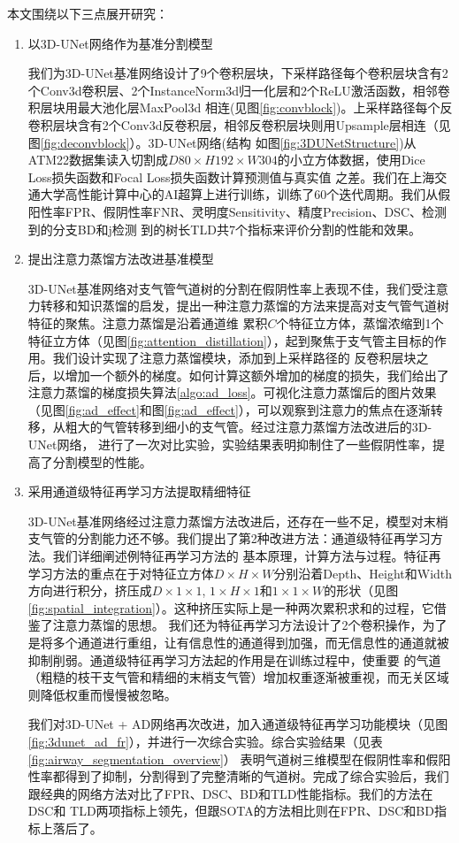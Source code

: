 本文围绕以下三点展开研究：
\begin{enumerate}
    \item {\heiti 以3D-UNet网络作为基准分割模型}

    我们为3D-UNet基准网络设计了9个卷积层块，下采样路径每个卷积层块含有2个Conv3d卷积层、2个InstanceNorm3d归一化层和2个ReLU激活函数，相邻卷积层块用最大池化层MaxPool3d
    相连(见图\ref{fig:convblock})。上采样路径每个反卷积层块含有2个Conv3d反卷积层，相邻反卷积层块则用Upsample层相连（见图\ref{fig:deconvblock}）。3D-UNet网络(结构
    如图\ref{fig:3DUNetStructure})从ATM22数据集读入切割成$D80 \times H192 \times W304$的小立方体数据，使用Dice Loss损失函数和Focal Loss损失函数计算预测值与真实值
    之差。我们在上海交通大学高性能计算中心的AI超算上进行训练，训练了60个迭代周期。我们从假阳性率FPR、假阴性率FNR、灵明度Sensitivity、精度Precision、DSC、检测到的分支BD和j检测
    到的树长TLD共7个指标来评价分割的性能和效果。

    \item {\heiti 提出注意力蒸馏方法改进基准模型}

    3D-UNet基准网络对支气管气道树的分割在假阴性率上表现不佳，我们受注意力转移和知识蒸馏的启发，提出一种注意力蒸馏的方法来提高对支气管气道树特征的聚焦。注意力蒸馏是沿着通道维
    累积$C$个特征立方体，蒸馏浓缩到1个特征立方体（见图\ref{fig:attention_distillation}），起到聚焦于支气管主目标的作用。我们设计实现了注意力蒸馏模块，添加到上采样路径的
    反卷积层块之后，以增加一个额外的梯度。如何计算这额外增加的梯度的损失，我们给出了注意力蒸馏的梯度损失算法\ref{algo:ad_loss}。可视化注意力蒸馏后的图片效果
    （见图\ref{fig:ad_effect}和图\ref{fig:ad_effect}），可以观察到注意力的焦点在逐渐转移，从粗大的气管转移到细小的支气管。经过注意力蒸馏方法改进后的3D-UNet网络，
    进行了一次对比实验，实验结果表明抑制住了一些假阴性率，提高了分割模型的性能。

    \item {\heiti 采用通道级特征再学习方法提取精细特征}

    3D-UNet基准网络经过注意力蒸馏方法改进后，还存在一些不足，模型对末梢支气管的分割能力还不够。我们提出了第2种改进方法：通道级特征再学习方法。我们详细阐述例特征再学习方法的
    基本原理，计算方法与过程。特征再学习方法的重点在于对特征立方体$D \times H \times W$分别沿着Depth、Height和Width方向进行积分，挤压成$D \times 1 \times 1$, 
    $1 \times H \times 1$和$1 \times 1 \times W$的形状（见图\ref{fig:spatial_integration}）。这种挤压实际上是一种两次累积求和的过程，它借鉴了注意力蒸馏的思想。
    我们还为特征再学习方法设计了2个卷积操作，为了是将多个通道进行重组，让有信息性的通道得到加强，而无信息性的通道就被抑制削弱。通道级特征再学习方法起的作用是在训练过程中，使重要
    的气道（粗糙的枝干支气管和精细的末梢支气管）增加权重逐渐被重视，而无关区域则降低权重而慢慢被忽略。

    我们对3D-UNet + AD网络再次改进，加入通道级特征再学习功能模块（见图\ref{fig:3dunet_ad_fr}），并进行一次综合实验。综合实验结果（见表\ref{fig:airway_segmentation_overview}）
    表明气道树三维模型在假阴性率和假阳性率都得到了抑制，分割得到了完整清晰的气道树。完成了综合实验后，我们跟经典的网络方法对比了FPR、DSC、BD和TLD性能指标。我们的方法在DSC和
    TLD两项指标上领先，但跟SOTA的方法相比则在FPR、DSC和BD指标上落后了。
\end{enumerate}

